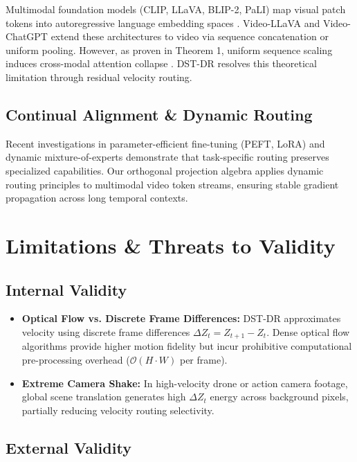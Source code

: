 \documentclass{article}
\begin{document}
Multimodal foundation models (CLIP, LLaVA, BLIP-2, PaLI) map visual patch tokens into autoregressive language embedding spaces \cite{arxiv_2005_14165,arxiv_2305_18290}. Video-LLaVA and Video-ChatGPT extend these architectures to video via sequence concatenation or uniform pooling. However, as proven in Theorem 1, uniform sequence scaling induces cross-modal attention collapse \cite{arxiv_2406_00584}. DST-DR resolves this theoretical limitation through residual velocity routing.


\subsection{Continual Alignment \& Dynamic Routing}

Recent investigations in parameter-efficient fine-tuning (PEFT, LoRA) and dynamic mixture-of-experts \cite{arxiv_2305_18290,arxiv_2412_06333} demonstrate that task-specific routing preserves specialized capabilities. Our orthogonal projection algebra applies dynamic routing principles to multimodal video token streams, ensuring stable gradient propagation across long temporal contexts.




\section{Limitations \& Threats to Validity}



\subsection{Internal Validity}

\begin{itemize}
  \item \textbf{Optical Flow vs. Discrete Frame Differences:} DST-DR approximates velocity using discrete frame differences $\Delta Z_t = Z_{t+1} - Z_t$. Dense optical flow algorithms provide higher motion fidelity but incur prohibitive computational pre-processing overhead ($\mathcal{O}(H \cdot W)$ per frame).
  \item \textbf{Extreme Camera Shake:} In high-velocity drone or action camera footage, global scene translation generates high $\Delta Z_t$ energy across background pixels, partially reducing velocity routing selectivity.
\end{itemize}


\subsection{External Validity}
\end{document}
